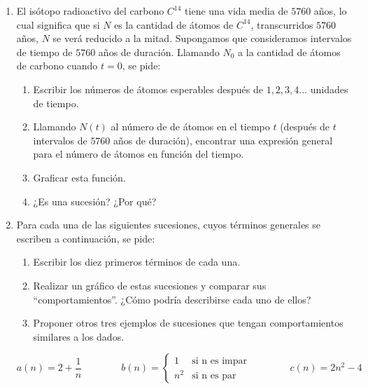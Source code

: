 \documentclass[12pt]{article}
\theoremstyle{definition}
\begin{document}
\begin{enumerate}
\item El isótopo radioactivo del carbono $C^{14}$ tiene una vida media de $5760$ años, lo cual significa que si $N$ es la cantidad de átomos de  $C^{14}$, transcurridos $5760$ años, $N$ se verá reducido a la mitad. Supongamos que consideramos intervalos de tiempo de $5760$ años de duración. Llamando $N_0$ a la cantidad de átomos de carbono cuando $t = 0$, se pide:
\begin{enumerate}
\setlength\itemsep{0em}
\item Escribir los números de átomos esperables después de $1, 2, 3, 4...$ unidades de tiempo.
\item Llamando $N(t)$ al número de  de átomos en el tiempo $t$ (después de $t$ intervalos de $5760$ años de duración), encontrar una expresión general para el número de átomos en función del tiempo.
\item Graficar esta función. 
\item ¿Es una sucesión? ¿Por qué?
\end{enumerate}


\item Para cada una de las siguientes sucesiones, cuyos términos generales se escriben a continuación, se pide:
\begin{enumerate}
\setlength\itemsep{0em}
\item Escribir los diez primeros términos de cada una.
\item Realizar un gráfico de estas sucesiones y comparar sus “comportamientos”. ¿Cómo podría describirse cada uno de ellos?
\item Proponer otros tres ejemplos de sucesiones que tengan comportamientos similares a los dados. 
\noindent
\end{enumerate}
\begin{equation*}
a(n) = 2 + \frac{1}{n} \qquad \qquad
b(n)= 
\begin{cases} 
1 & \text{si  n es impar} \\
n^2 & \text{si  n es par}
\end{cases} \qquad \qquad
c(n) = 2n^2 -4
\end{equation*}

\vspace{1 cm}



\end{enumerate}
\end{document}
